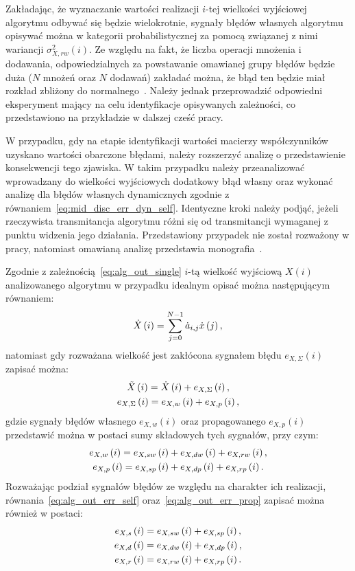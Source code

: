 Zakładając, że wyznaczanie wartości realizacji $i$-tej wielkości wyjściowej algorytmu odbywać się będzie wielokrotnie, sygnały błędów własnych algorytmu opisywać można w kategorii probabilistycznej za pomocą związanej z nimi wariancji $\sigma_{X,rw}^{2}(i)$. Ze względu na fakt, że liczba operacji mnożenia i dodawania, odpowiedzialnych za powstawanie omawianej grupy błędów będzie duża ($N$ mnożeń oraz $N$ dodawań) zakładać można, że błąd ten będzie miał rozkład zbliżony do normalnego~\cite{jcgm_guide}. Należy jednak przeprowadzić odpowiedni eksperyment mający na celu identyfikacje opisywanych zależności, co przedstawiono na przykładzie w dalszej cześć pracy.

W przypadku, gdy na etapie identyfikacji wartości macierzy współczynników uzyskano wartości obarczone błędami, należy rozszerzyć analizę o przedstawienie konsekwencji tego zjawiska. W takim przypadku należy przeanalizować wprowadzany do wielkości wyjściowych dodatkowy błąd własny oraz wykonać analizę dla błędów własnych dynamicznych zgodnie z równaniem~\eqref{eq:mid_disc_err_dyn_self}. Identyczne kroki należy podjąć, jeżeli rzeczywista transmitancja algorytmu różni się od transmitancji wymaganej z punktu widzenia jego działania. Przedstawiony przypadek nie został rozważony w pracy, natomiast omawianą analizę przedstawia monografia~\cite{jakubiec_system}.

Zgodnie z zależnością~\eqref{eq:alg_out_single} $i$-tą wielkość wyjściową $X(i)$ analizowanego algorytmu w przypadku idealnym opisać można następującym równaniem:
\begin{equation}
\dot{X} \left(i\right) = \sum _{j = 0} ^{N-1} \dot{a}_{i,j} \dot{x} \left(j\right) \label{eq:alg_out_ideal},
\end{equation}
natomiast gdy rozważana wielkość jest zakłócona sygnałem błędu $e_{X,\Sigma}(i)$ zapisać można:
\begin{gather}
\tilde{X} \left(i\right) = \dot{X} \left(i\right) + e_{X,\Sigma} \left(i\right) \label{eq:alg_out_real}, \\
e_{X,\Sigma} \left(i\right) = e_{X,w} \left(i\right) + e_{X,p} \left(i\right) \label{eq:alg_out_err},
\end{gather}
gdzie sygnały błędów własnego $e_{X,w}(i)$ oraz propagowanego $e_{X,p}(i)$ przedstawić można w postaci sumy składowych tych sygnałów, przy czym:
\begin{gather}
e_{X,w} \left(i\right) = e_{X,sw} \left(i\right) + e_{X,dw} \left(i\right) + e_{X,rw} \left(i\right) \label{eq:alg_out_err_self}, \\
e_{X,p} \left(i\right) = e_{X,sp} \left(i\right) + e_{X,dp} \left(i\right) + e_{X,rp} \left(i\right) \label{eq:alg_out_err_prop}.
\end{gather}
Rozważając podział sygnałów błędów ze względu na charakter ich realizacji, równania~\eqref{eq:alg_out_err_self} oraz~\eqref{eq:alg_out_err_prop} zapisać można również w postaci:
\begin{gather}
e_{X,s} \left(i\right) = e_{X,sw} \left(i\right) + e_{X,sp} \left(i\right) \label{eq:alg_out_err_stat}, \\
e_{X,d} \left(i\right) = e_{X,dw} \left(i\right) + e_{X,dp} \left(i\right) \label{eq:alg_out_err_dyn}, \\
e_{X,r} \left(i\right) = e_{X,rw} \left(i\right) + e_{X,rp} \left(i\right) \label{eq:alg_out_err_rand}.
\end{gather}

